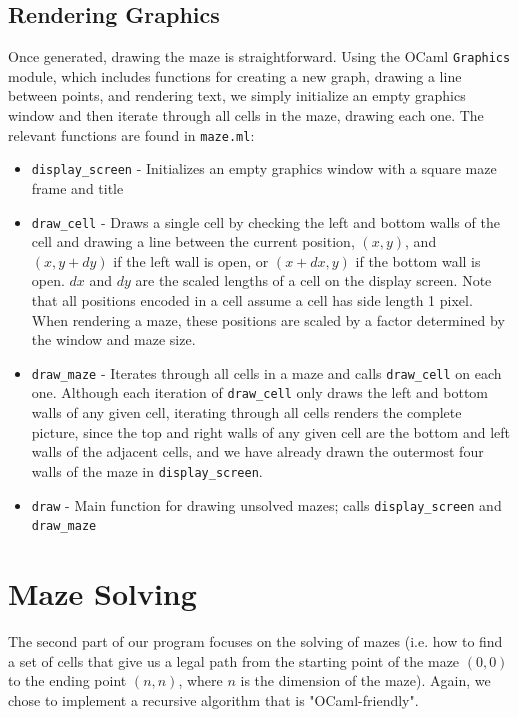 \documentclass[11pt, margin=1in]{article}
\begin{document}
\subsection{Rendering Graphics} %
Once generated, drawing the maze is straightforward. Using the OCaml \texttt{Graphics} module, which includes functions for creating a new graph, drawing a line between points, and rendering text, we simply initialize an empty graphics window and then iterate through all cells in the maze, drawing each one. The relevant functions are found in \texttt{maze.ml}:

\begin{itemize}
\item \texttt{display\_screen} - Initializes an empty graphics window with a square maze frame and title
\item \texttt{draw\_cell} - Draws a single cell by checking the left and bottom walls of the cell and drawing a line between the current position, $(x, y)$, and $(x, y + dy)$ if the left wall is open, or $(x + dx, y)$ if the bottom wall is open. $dx$ and $dy$ are the scaled lengths of a cell on the display screen. Note that all positions encoded in a cell assume a cell has side length 1 pixel. When rendering a maze, these positions are scaled by a factor determined by the window and maze size.
\item \texttt{draw\_maze} - Iterates through all cells in a maze and calls \texttt{draw\_cell} on each one. Although each iteration of \texttt{draw\_cell} only draws the left and bottom walls of any given cell, iterating through all cells renders the complete picture, since the top and right walls of any given cell are the bottom and left walls of the adjacent cells, and we have already drawn the outermost four walls of the maze in \texttt{display\_screen}. 
\item \texttt{draw} - Main function for drawing unsolved mazes; calls \texttt{display\_screen} and \texttt{draw\_maze}
\end{itemize} 

\section{Maze Solving} 
The second part of our program focuses on the solving of mazes (i.e. how to find a set of cells that give us a legal path from the starting point of the maze $(0, 0)$ to the ending point $(n, n)$, where $n$ is the dimension of the maze).  Again, we chose to implement a recursive algorithm that is "OCaml-friendly".    
\end{document}
